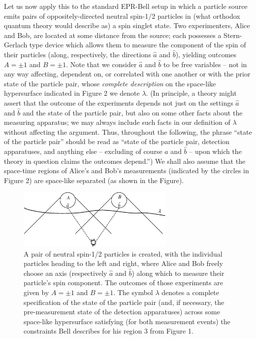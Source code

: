 \documentclass[aps,prc,onecolumn,12pt]{revtex4-2}
\begin{document}
Let us now apply this to the standard EPR-Bell setup
in which a particle source emits
pairs of oppositely-directed neutral spin-1/2 particles in (what
orthodox quantum theory would describe as) a spin singlet state.  Two
experimenters, Alice and Bob, are located at some distance from the
source; each possesses a Stern-Gerlach type device which allows them
to measure the component of the spin of their particles (along,
respectively, the directions $\hat{a}$ and $\hat{b}$), yielding
outcomes $A = \pm 1$ and $B= \pm 1$.  Note that we consider $\hat{a}$
and $\hat{b}$ to be free variables -- not in any way affecting,
dependent on, or
correlated with one another or with the prior state of the
particle pair, whose \emph{complete description} on the space-like
hypersurface indicated in Figure 2 we denote $\lambda$.  (In
principle, a theory might assert that the outcome of the experiments
depends not just on the settings $\hat{a}$ and $\hat{b}$ and the state
of the particle pair, but also on some other facts about the measuring
apparatus; we may always include such facts in our definition of
$\lambda$ without affecting the argument.  Thus, throughout the
following, the phrase ``state of the particle pair'' should be read as
``state of the particle pair, detection apparatuses, and anything else
-- excluding of course $\hat{a}$ and $\hat{b}$ --
upon which the theory in question claims the outcomes depend.'')
We shall also assume that the space-time regions of Alice's and Bob's
measurements (indicated by the circles in Figure 2) are space-like
separated (as shown in the Figure).

\begin{figure}
\begin{center}
\includegraphics[width=3.0in,clip]{./eprsetup.eps}
\end{center}
\caption{
\label{fig2}
A pair of neutral spin-1/2 particles
is created, with the individual particles heading
to the left and right, where Alice and Bob freely choose an axis
(respectively $\hat{a}$ and $\hat{b}$) along which to measure their
particle's spin component.  The outcomes of those experiments are
given by $A = \pm 1$ and $B = \pm 1$.  The symbol $\lambda$ denotes a
complete specification of the state of the particle pair (and, if
necessary, the pre-measurement state of the detection apparatuses) across
some space-like hypersurface satisfying (for both measurement events)
the constraints Bell describes for his region 3 from Figure 1.
}
\end{figure}
\end{document}
